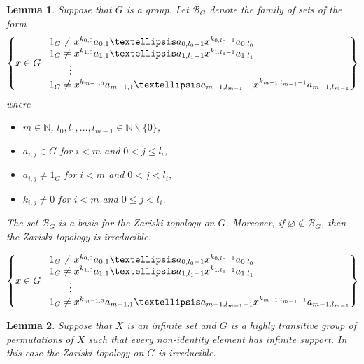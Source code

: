\documentclass[10pt,a4paper]{amsart}
\makeatletter
\newtheorem{lemma}{Lemma}
\newcommand{\N}{\mathbb N}
\newcommand{\makeset}[2]{\left\lbrace #1 \;\middle|\;
 \begin{tabular}{@{}l@{}}
   #2
  \end{tabular}
  \right\rbrace}
\makeatother
\begin{document}
\begin{lemma}\label{lem:techZariski}
    Suppose that \(G\) is a group.
    Let \(\mathcal{B}_G\) denote the family of sets of the form
    \begin{equation}\label{bigeq}
       \makeset{x\in G}{\(1_G\neq x^{k_{0,0}}a_{0,1}\ldots a_{0,l_0-1}x^{k_{0,l_0-1}}a_{0,l_0}\)\\
   \(1_G\neq x^{k_{1,0}}a_{1,1}\ldots a_{1,l_1-1}x^{k_{1,l_1-1}}a_{1,l_1}\)\\
   \quad\quad\vdots\\
   \(1_G\neq x^{k_{m-1,0}}a_{m-1,1}\ldots a_{m-1,l_{m-1}-1}x^{k_{m-1,l_{m-1}-1}}a_{m-1,l_{m-1}}\)}
    \end{equation}
    where  
    \begin{itemize}
    \item \(m\in \N\), \(l_0,l_1,\ldots, l_{m-1}\in \N\backslash \{0\}\),
        \item  \(a_{i,j}\in G\) for \(i<m\) and \(0<j\leq l_i\),
        \item  \(a_{i,j}\neq 1_G\) for \(i<m\) and \(0<j<l_i\),
        \item  \(k_{i,j}\neq 0\) for \(i<m\) and \(0\leq j<l_i\).
    \end{itemize}
    The set \(\mathcal{B}_G\) is a basis for the Zariski topology on \(G\).
    Moreover, if \(\varnothing\notin \mathcal{B}_G\), then the Zariski topology is irreducible.
\end{lemma}

    \begin{equation}
       \makeset{x\in G}{\(1_G\neq x^{k_{0,0}}a_{0,1}\ldots a_{0,l_0-1}x^{k_{0,l_0-1}}a_{0,l_0}\)\\
   \(1_G\neq x^{k_{1,0}}a_{1,1}\ldots a_{1,l_1-1}x^{k_{1,l_1-1}}a_{1,l_1}\)\\
   \quad\quad\vdots\\
   \(1_G\neq x^{k_{m-1,0}}a_{m-1,1}\ldots a_{m-1,l_{m-1}-1}x^{k_{m-1,l_{m-1}-1}}a_{m-1,l_{m-1}}\)}
    \end{equation}

\begin{lemma}\label{main}
    Suppose that \(X\) is an infinite set and \(G\) is a highly transitive group of permutations of \(X\) such that every non-identity element has infinite support.
    In this case the Zariski topology on \(G\) is irreducible.
\end{lemma}
\end{document}
